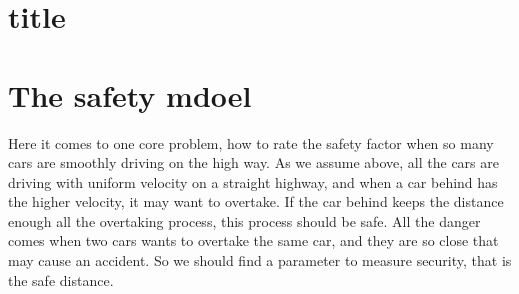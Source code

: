 \section*{title}
\section*{The safety mdoel}
Here it comes to one core problem, how to rate the safety factor when so many cars are smoothly driving on the high way. As we assume above, all the cars are driving with uniform velocity on a straight highway, and when a car behind has the higher velocity, it may want to overtake. If the car behind keeps the distance enough all the overtaking process, this process should be safe. All the danger comes when two cars wants to overtake the same car, and they are so close that may cause an accident. So we should find a parameter to measure security, that is the safe distance.
